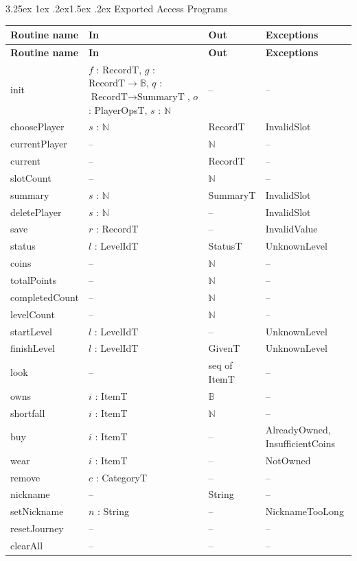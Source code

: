 \documentclass[10pt, titlepage]{article}
\makeatletter
\renewcommand\paragraph{\@startsection{paragraph}{4}{\z@}%
  {3.25ex \@plus 1ex \@minus .2ex}{1.5ex \@plus .2ex}%
  {\normalfont\normalsize\bfseries}}
\newcommand{\B}{\mathbb{B}}
\newcommand{\N}{\mathbb{N}}
\makeatother
\begin{document}
\paragraph{Exported Access Programs}

\begingroup
\small
\begin{longtable}{>{\raggedright\arraybackslash}p{3.0cm}
  >{\raggedright\arraybackslash}p{5.0cm}
  >{\raggedright\arraybackslash}p{2.8cm}
  >{\raggedright\arraybackslash}p{3.4cm}}
\toprule
\textbf{Routine name} & \textbf{In} & \textbf{Out} & \textbf{Exceptions}\\
\midrule
\endfirsthead
\toprule
\textbf{Routine name} & \textbf{In} & \textbf{Out} & \textbf{Exceptions}\\
\midrule
\endhead
\bottomrule
\endfoot
init & $f$ : RecordT, $g$ : $\text{RecordT} \to \B$, $q$ :
$\text{RecordT} \to \text{SummaryT}$, $o$ : PlayerOpsT, $s$ : $\N$ & -- & --\\
choosePlayer & $s$ : $\N$ & RecordT & InvalidSlot\\
currentPlayer & -- & $\N$ & --\\
current & -- & RecordT & --\\
slotCount & -- & $\N$ & --\\
summary & $s$ : $\N$ & SummaryT & InvalidSlot\\
deletePlayer & $s$ : $\N$ & -- & InvalidSlot\\
save & $r$ : RecordT & -- & InvalidValue\\
status & $l$ : LevelIdT & StatusT & UnknownLevel\\
coins & -- & $\N$ & --\\
totalPoints & -- & $\N$ & --\\
completedCount & -- & $\N$ & --\\
levelCount & -- & $\N$ & --\\
startLevel & $l$ : LevelIdT & -- & UnknownLevel\\
finishLevel & $l$ : LevelIdT & GivenT & UnknownLevel\\
look & -- & seq of ItemT & --\\
owns & $i$ : ItemT & $\B$ & --\\
shortfall & $i$ : ItemT & $\N$ & --\\
buy & $i$ : ItemT & -- & AlreadyOwned, InsufficientCoins\\
wear & $i$ : ItemT & -- & NotOwned\\
remove & $c$ : CategoryT & -- & --\\
nickname & -- & String & --\\
setNickname & $n$ : String & -- & NicknameTooLong\\
resetJourney & -- & -- & --\\
clearAll & -- & -- & --\\
\end{longtable}
\endgroup
\end{document}
